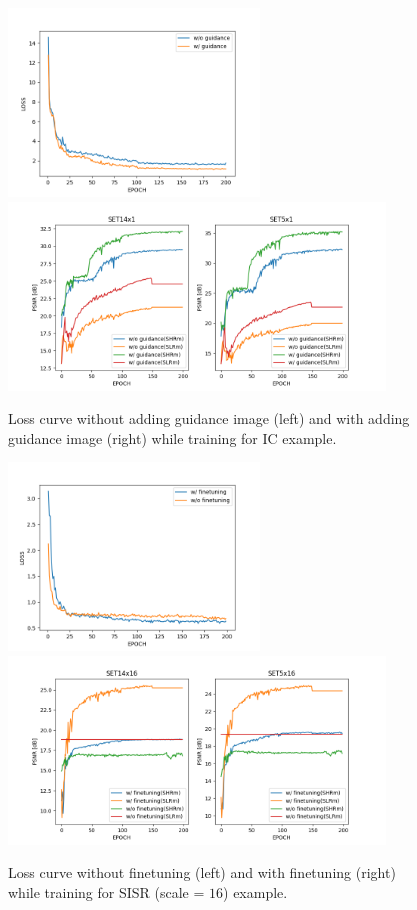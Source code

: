 \begin{figure}[!htbp]
    \centering
    \includegraphics[height=5cm]{figures/guidance_loss.png}
    \includegraphics[height=5cm]{figures/guidance_psnrs.png}
    \caption{Loss curve without adding guidance image (left) and with
    adding guidance image (right) while training for \ac{IC} example.}
    \label{fig:loss_w_wo_adding_guidance}
\end{figure}

\begin{figure}[!htbp]
    \centering
    \includegraphics[height=5cm]{figures/finetuning_loss.png}
    \includegraphics[height=5cm]{figures/finetuning_psnrs_16.png}
    \caption{Loss curve without finetuning (left) and with finetuning (right) while training for \ac{SISR} (scale = $16$) example.}
    \label{fig:loss_w_wo_finetuning}
\end{figure}

